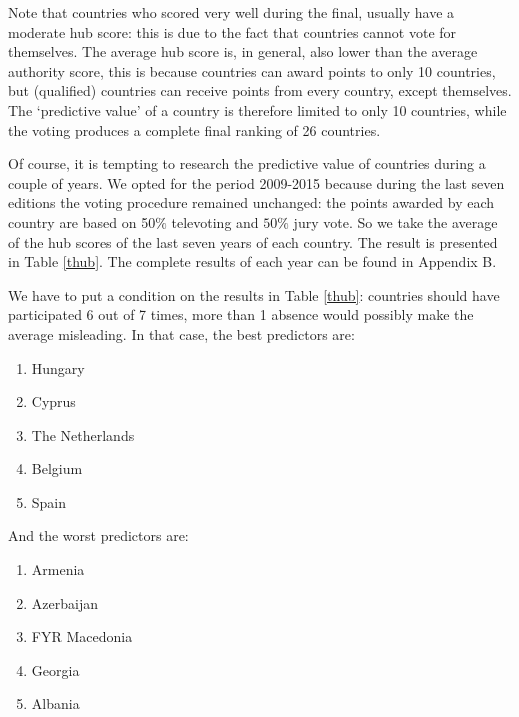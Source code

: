 \documentclass[a4paper,11pt]{report}
\begin{document}
Note that countries who scored very well during 
the final, usually have a moderate hub score: this is due to the fact that 
countries cannot vote for themselves. The average hub score is, in general, also 
lower than the average authority score, this is because countries can award 
points to only 10 countries, but (qualified) countries can receive points from 
every country, except themselves. The `predictive value' of a country is 
therefore limited to only 10 countries, while the voting produces a complete final ranking of 26 
countries.

Of course, it is tempting to research the predictive value of countries during a 
couple of years. We opted for the period 2009-2015 because during the last seven 
editions the voting procedure remained unchanged: the points awarded by each country are based on 50$\%$ televoting and
$50\%$ jury vote. So we take the average of the hub scores of the last seven
years of each country. The result is presented in Table \ref{thub}. The complete results of each year can be found in Appendix B. 

We have to put a  condition on the results in Table \ref{thub}: countries should 
have participated 6 out of 7 times, more than 1 absence would possibly make the average misleading. 
In that case, the best predictors are:

\begin{enumerate}
  \item Hungary
  \item Cyprus
  \item The Netherlands
  \item Belgium
  \item Spain
\end{enumerate}

And the worst predictors are:
\begin{enumerate}
  \item Armenia
  \item Azerbaijan
  \item FYR Macedonia
  \item Georgia
  \item Albania
\end{enumerate}
\end{document}
